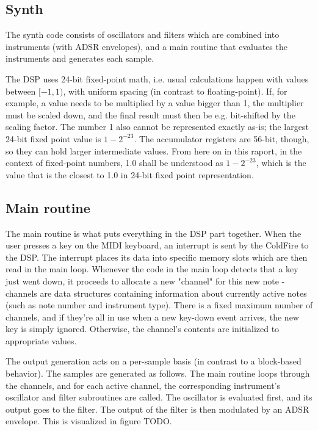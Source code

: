 \documentclass[10pt,a4paper,oneside]{article}
\begin{document}
\subsection{Synth}

The synth code consists of oscillators and filters which are combined into instruments (with ADSR envelopes), and a main routine that evaluates the instruments and generates each sample.

The DSP uses 24-bit fixed-point math, i.e. usual calculations happen with values between $[-1,1)$, with uniform spacing (in contrast to floating-point). If, for example, a value needs to be multiplied by a value bigger than 1, the multiplier must be scaled down, and the final result must then be e.g. bit-shifted by the scaling factor. The number 1 also cannot be represented exactly as-is; the largest 24-bit fixed point value is $1-2^{-23}$. The accumulator registers are 56-bit, though, so they can hold larger intermediate values. From here on in this raport, in the context of fixed-point numbers, 1.0 shall be understood as $1-2^{-23}$, which is the value that is the closest to 1.0 in 24-bit fixed point representation.


\subsection{Main routine}

The main routine is what puts everything in the DSP part together. When the user presses a key on the MIDI keyboard, an interrupt is sent by the ColdFire to the DSP. The interrupt places its data into specific memory slots which are then read in the main loop. Whenever the code in the main loop detects that a key just went down, it proceeds to allocate a new "channel" for this new note - channels are data structures containing information about currently active notes (such as note number and instrument type). There is a fixed maximum number of channels, and if they're all in use when a new key-down event arrives, the new key is simply ignored. Otherwise, the channel's contents are initialized to appropriate values.

The output generation acts on a per-sample basis (in contrast to a block-based behavior). The samples are generated as follows. The main routine loops through the channels, and for each active channel, the corresponding instrument's oscillator and filter subroutines are called. The oscillator is evaluated first, and its output goes to the filter. The output of the filter is then modulated by an ADSR envelope. This is visualized in figure TODO.
\end{document}
